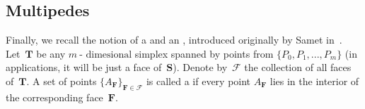 \documentclass[12pt, reqno]{amsart}
\theoremstyle{definition}
\theoremstyle{remark}
\numberwithin{equation}{section}
\begin{document}
{\subsection{Multipedes} 
%
%
%
Finally, we recall the notion of a  and an , introduced originally by Samet in~\cite{Samet}. Let~$\mathbf{T}$ be any $m~\mbox{- dimesional}$ simplex spanned by points from $\{P_0,P_1,...,P_m\}$ (in applications, it will be just a face of~$\mathbf{S}$). Denote by~$\mathcal{F}$ the collection of all faces of~$\mathbf{T}$. A set of points $\{A_{\mathbf{F}}\}_{\mathbf{F}\in \mathcal{F}}$ is called a  if every point $A_\mathbf{F}$ lies in the interior of the corresponding face~$\mathbf{F}$.

}
\end{document}
